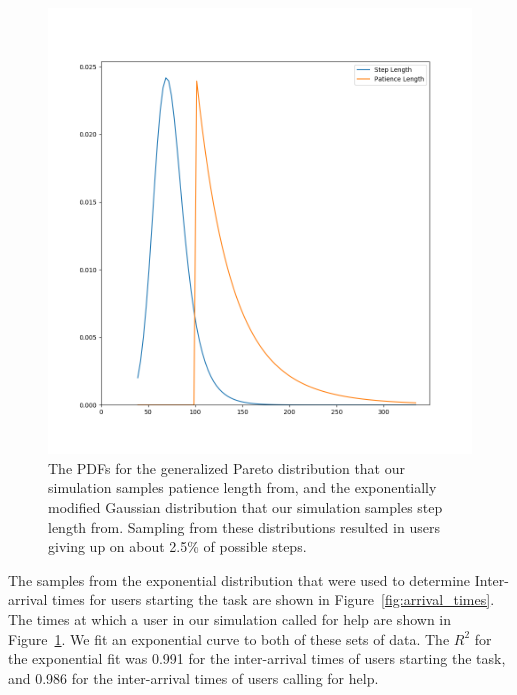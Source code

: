 \begin{figure}[H]
  \includegraphics[width=\textwidth]{figures/montecarlo/step_patience.png}
  \caption{
    The PDFs for the generalized Pareto distribution that our simulation samples
    patience length from, and the exponentially modified Gaussian distribution
    that our simulation samples step length from.
    Sampling from these distributions resulted in users giving up on about 2.5\%
    of possible steps.
  }\label{fig:step_patience}
\end{figure}

The samples from the exponential distribution that were used to determine
Inter-arrival times for users starting the task are shown in
Figure~\ref{fig:arrival_times}.
The times at which a user in our simulation called for help are shown in
Figure~\ref{fig:step_patience}.
We fit an exponential curve to both of these sets of data.
The $R^2$ for the exponential fit was 0.991 for the inter-arrival times of users
starting the task, and 0.986 for the inter-arrival times of users calling for
help.

